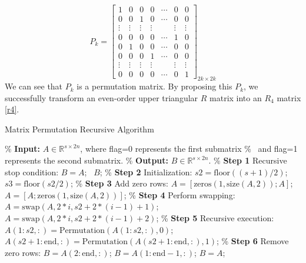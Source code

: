 \documentclass[3p]{elsarticle}
\numberwithin{equation}{section}
\begin{document}
\begin{equation}\label{p}
    P_k = \begin{bmatrix} 
            1 & 0 & 0 & 0 & \cdots & 0 & 0\\ 
            0 & 0 & 1 & 0 & \cdots & 0 & 0\\ 
            \vdots & \vdots & \vdots & \vdots &  & \vdots & \vdots\\ 
            0 & 0 & 0 & 0 & \cdots & 1 & 0 \\
            0 & 1 & 0 & 0 & \cdots & 0 & 0\\ 
            0 & 0 & 0 & 1 & \cdots & 0 & 0\\ 
            \vdots & \vdots & \vdots & \vdots &  & \vdots & \vdots\\ 
            0 & 0 & 0 & 0 &\cdots & 0 & 1 
        \end{bmatrix}_{2k \times 2k}
\end{equation}
{\color{red} We can see that $P_k$ is a permutation matrix. By proposing this $P_k$, we successfully transform an even-order upper triangular $R$ matrix into an $R_4$ matrix \eqref{r4}.}


\begin{algorithm}[htbp]
    \caption{Matrix Permutation Recursive Algorithm} \label{alg:Permutation}
    \begin{algorithmic}
        \State \% \textbf{Input:} $A \in \mathbb{R}^{s \times 2n}$, where flag=0 represents the first submatrix 
        \State \% \qquad\quad\ and flag=1 represents the second submatrix.
        \State \% \textbf{Output:} $B \in \mathbb{R}^{s \times 2n}$.
        \State \% \textbf{Step 1} Recursive stop condition:
         \State $B=A$; \Return \ $B$;\End
        \State \% \textbf{Step 2} Initialization:
        \State $s2 = \text{floor}((s+1)/2)$;
        \State $s3 = \text{floor}(s2/2)$;
        \State \% \textbf{Step 3} Add zero rows:
                \State $A = [\text{zeros}(1, \text{size}(A, 2)); A]$;
            \Else
                \State $A = [A; \text{zeros}(1, \text{size}(A, 2))]$;
            \End
        \End
        \State \% \textbf{Step 4} Perform swapping:
                \State $A= \text{swap}(A,2*i,s2+2*(i-1)+1)$;
            \Else
                \State $A= \text{swap}(A,2*i,s2+2*(i-1)+2)$;
            \End
        \End
        \State \% \textbf{Step 5} Recursive execution:
        \State $A(1:s2, :) = \text{Permutation}(A(1:s2, :), 0)$;
        \State $A(s2+1:\text{end}, :) = \text{Permutation}(A(s2+1:\text{end}, :), 1)$;
        \State \% \textbf{Step 6} Remove zero rows:
                \State $B = A(2:\text{end}, :)$;
            \Else
                \State $B = A(1:\text{end}-1, :)$;
            \End
        \Else
            \State $B=A$;
        \End
    \End 
    \end{algorithmic}
\end{algorithm}
\end{document}
